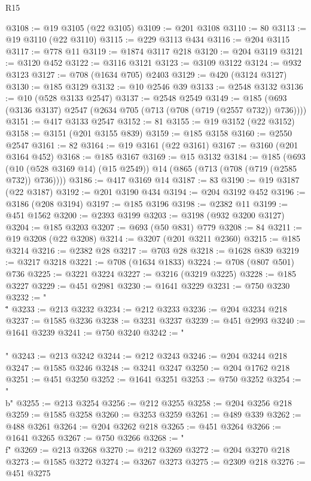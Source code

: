 \begin{lexlean}{R15}
\begin{coremodule}
{{{{{{{{{{{@3108 := @19 @3105 (@22 @3105)
@3109 := @201 @3108
@3110 := 80
@3113 := @19 @3110 (@22 @3110)
@3115 := @229 @3113 @434
@3116 := @204 @3115
@3117 := @778 @11
@3119 := @1874 @3117 @218
@3120 := @204 @3119
@3121 := @3120 @452
@3122 := @3116 @3121
@3123 := @3109 @3122
@3124 := @932 @3123
@3127 := @708 (@1634 @705) @2403
@3129 := @420 (@3124 @3127)
@3130 := @185 @3129
@3132 := @10 @2546 @39
@3133 := @2548 @3132
@3136 := @10 (@528 @3133 @2547)
@3137 := @2548 @2549
@3149 := @185 (@693 (@3136 @3137) @2547 (@2634 @705 (@713 (@708 (@719 (@2557 @732)) @736))))
@3151 := @417 @3133 @2547
@3152 := 81
@3155 := @19 @3152 (@22 @3152)
@3158 := @3151 (@201 @3155 @839)
@3159 := @185 @3158
@3160 := @2550 @2547
@3161 := 82
@3164 := @19 @3161 (@22 @3161)
@3167 := @3160 (@201 @3164 @452)
@3168 := @185 @3167
@3169 := @15 @3132
@3184 := @185
    (@693 (@10 (@528 @3169 @14) (@15 @2549)) @14 (@865 (@713 (@708 (@719 (@2585 @732)) @736))))
@3186 := @417 @3169 @14
@3187 := 83
@3190 := @19 @3187 (@22 @3187)
@3192 := @201 @3190 @434
@3194 := @204 @3192 @452
@3196 := @3186 (@208 @3194)
@3197 := @185 @3196
@3198 := @2382 @11
@3199 := @451 @1562
@3200 := @2393 @3199
@3203 := @3198 (@932 @3200 @3127)
@3204 := @185 @3203
@3207 := @693 (@50 @831) @779
@3208 := 84
@3211 := @19 @3208 (@22 @3208)
@3214 := @3207 (@201 @3211 @2360)
@3215 := @185 @3214
@3216 := @2382 @28
@3217 := @703 @28
@3218 := @1628 @839
@3219 := @3217 @3218
@3221 := @708 (@1634 @1833)
@3224 := @708 (@807 @501) @736
@3225 := @3221 @3224
@3227 := @3216 (@3219 @3225)
@3228 := @185 @3227
@3229 := @451 @2981
@3230 := @1641 @3229
@3231 := @750 @3230
@3232 := "\\\""
@3233 := @213 @3232
@3234 := @212 @3233
@3236 := @204 @3234 @218
@3237 := @1585 @3236
@3238 := @3231 @3237
@3239 := @451 @2993
@3240 := @1641 @3239
@3241 := @750 @3240
@3242 := "\\\\"
@3243 := @213 @3242
@3244 := @212 @3243
@3246 := @204 @3244 @218
@3247 := @1585 @3246
@3248 := @3241 @3247
@3250 := @204 @1762 @218
@3251 := @451 @3250
@3252 := @1641 @3251
@3253 := @750 @3252
@3254 := "\\b"
@3255 := @213 @3254
@3256 := @212 @3255
@3258 := @204 @3256 @218
@3259 := @1585 @3258
@3260 := @3253 @3259
@3261 := @489 @339
@3262 := @488 @3261
@3264 := @204 @3262 @218
@3265 := @451 @3264
@3266 := @1641 @3265
@3267 := @750 @3266
@3268 := "\\f"
@3269 := @213 @3268
@3270 := @212 @3269
@3272 := @204 @3270 @218
@3273 := @1585 @3272
@3274 := @3267 @3273
@3275 := @2309 @218
@3276 := @451 @3275
}}}}}}}}}}}
\end{coremodule}
\end{lexlean}
